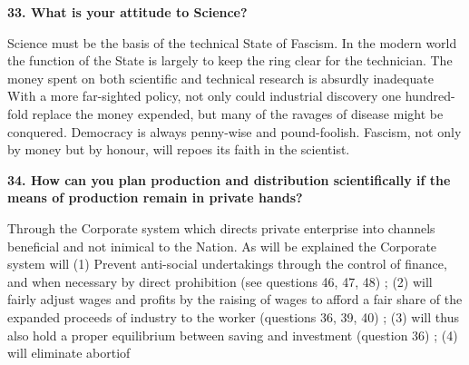\documentclass{book}
\begin{document}
\begin{flushleft}
\textbf{33. What is your attitude to Science?}

Science must be the basis of the technical State of Fascism. In the modern world the function of
the State is largely to keep the ring clear for the technician. The money spent on both scientific
and technical research is absurdly inadequate With a more far-sighted policy, not only could
industrial discovery one hundred-fold replace the money expended, but many of the ravages of
disease might be conquered. Democracy is always penny-wise and pound-foolish. Fascism, not only by money but by honour, will repoes its faith in the scientist.
\end{flushleft}

\begin{flushright}
    \textbf{34. How can you plan production and distribution scientifically if the means of production remain in private hands?}

Through the Corporate system which directs private enterprise into channels beneficial and not
inimical to the Nation. As will be explained the Corporate system will (1) Prevent anti-social
undertakings through the control of finance, and when necessary by direct prohibition (see
questions 46, 47, 48) ; (2) will fairly adjust wages and profits by the raising of wages to afford a
fair share of the expanded proceeds of industry to the worker (questions 36, 39, 40) ; (3) will thus
also hold a proper equilibrium between saving and investment (question 36) ; (4) will eliminate abortiof

\end{flushright}
\end{document}
